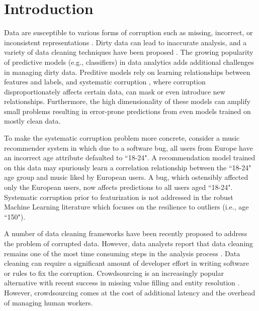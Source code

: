 \section{Introduction}
Data are susceptible to various forms of corruption such as missing, incorrect, or inconsistent representations \cite{Gartner}.
Dirty data can lead to inaccurate analysis, and a variety of data cleaning techniques have been proposed \cite{rahm2000data}.
The growing popularity of predictive models (e.g., classifiers) in data analytics \cite{bdas, alexandrov2014stratosphere, crotty2014tupleware, hellerstein2012madlib} adds additional challenges in managing dirty data.
Preditive models rely on learning relationships between features and labels, and systematic corruption \cite{taylor1982introduction}, where corruption disproportionately affects certain data, can mask or even introduce new relationships.
Furthermore, the high dimensionality of these models can amplify small problems \cite{xiaofeature} resulting in error-prone predictions from even models trained on mostly clean data.

To make the systematic corruption problem more concrete, consider a music recommender system in which due to a software bug, all users from Europe have an incorrect age attribute defaulted to ``18-24".
A recommendation model trained on this data may spuriously learn a correlation relationship between the ``18-24" age group and music liked by European users.
A bug, which ostensibly affected only the European users, now affects predictions to all users aged ``18-24".
Systematic corruption prior to featurization is not addressed in the robust Machine Learning literature which focuses on the resilience to outliers (i.e., age ``150").

A number of data cleaning frameworks have been recently proposed \cite{khayyat2015bigdansing, chu2015katara, sampleclean} to address the problem of corrupted data.
However, data analysts report that data cleaning remains one of the most time consuming steps in the analysis process \cite{nytimes}.
Data cleaning can require a significant amount of developer effort in writing software or rules to fix the corruption.
Crowdsourcing is an increasingly popular alternative with recent success in missing value filling and entity resolution \cite{gokhale2014corleone, park2014crowdfill, sampleclean,chu2015katara}.
However, crowdsourcing comes at the cost of additional latency and the overhead of managing human workers.


